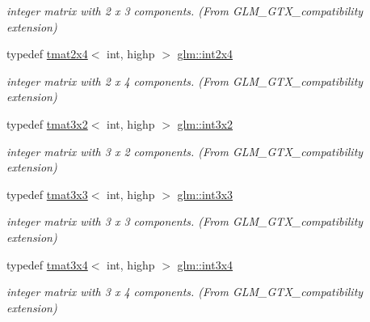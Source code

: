 \begin{DoxyCompactItemize}
\begin{DoxyCompactList}\small\item\em integer matrix with 2 x 3 components. (From G\+L\+M\+\_\+\+G\+T\+X\+\_\+compatibility extension) \end{DoxyCompactList}\item 
\mbox{\label{group__gtx__compatibility_gaa402ce479f756c0805d25fede99251e3}} 
typedef \hyperlink{structglm_1_1tmat2x4}{tmat2x4}$<$ int, highp $>$ \hyperlink{group__gtx__compatibility_gaa402ce479f756c0805d25fede99251e3}{glm\+::int2x4}
\begin{DoxyCompactList}\small\item\em integer matrix with 2 x 4 components. (From G\+L\+M\+\_\+\+G\+T\+X\+\_\+compatibility extension) \end{DoxyCompactList}\item 
\mbox{\label{group__gtx__compatibility_gac99c78a227d95384611146a64c4d3ce8}} 
typedef \hyperlink{structglm_1_1tmat3x2}{tmat3x2}$<$ int, highp $>$ \hyperlink{group__gtx__compatibility_gac99c78a227d95384611146a64c4d3ce8}{glm\+::int3x2}
\begin{DoxyCompactList}\small\item\em integer matrix with 3 x 2 components. (From G\+L\+M\+\_\+\+G\+T\+X\+\_\+compatibility extension) \end{DoxyCompactList}\item 
\mbox{\label{group__gtx__compatibility_ga4eb54b9ea96f12c04faaf2ca7b7c8c70}} 
typedef \hyperlink{structglm_1_1tmat3x3}{tmat3x3}$<$ int, highp $>$ \hyperlink{group__gtx__compatibility_ga4eb54b9ea96f12c04faaf2ca7b7c8c70}{glm\+::int3x3}
\begin{DoxyCompactList}\small\item\em integer matrix with 3 x 3 components. (From G\+L\+M\+\_\+\+G\+T\+X\+\_\+compatibility extension) \end{DoxyCompactList}\item 
\mbox{\label{group__gtx__compatibility_ga7500192cce87fb3a48f7119d6646af5a}} 
typedef \hyperlink{structglm_1_1tmat3x4}{tmat3x4}$<$ int, highp $>$ \hyperlink{group__gtx__compatibility_ga7500192cce87fb3a48f7119d6646af5a}{glm\+::int3x4}
\begin{DoxyCompactList}\small\item\em integer matrix with 3 x 4 components. (From G\+L\+M\+\_\+\+G\+T\+X\+\_\+compatibility extension) \end{DoxyCompactList}\item 

\end{DoxyCompactItemize}
